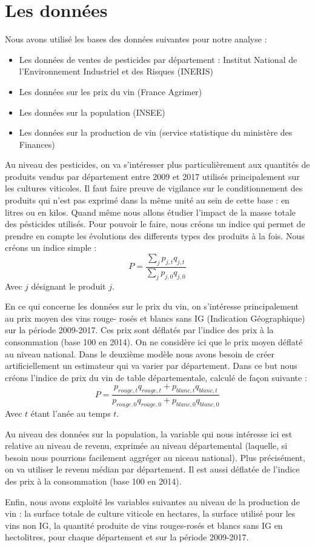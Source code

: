\documentclass[11pt, a4paper]{article}
\begin{document}
\section{Les données}
Nous avons utilisé les bases des données suivantes pour notre analyse :
\begin{itemize}
    \item Les données de ventes de pesticides par département : Institut National de l’Environnement Industriel et des Risques (INERIS)
    \item Les données sur les prix du vin (France Agrimer)
    \item Les données sur la population (INSEE)
    \item Les données sur la production de vin (service statistique du ministère des Finances)
\end{itemize}
\par
Au niveau des pesticides, on va s’intéresser plus particulièrement aux quantités de produits vendus par département entre 2009 et 2017 utilisés principalement sur les cultures viticoles. 
Il faut faire preuve de vigilance sur le conditionnement des produits qui n’est pas exprimé dans la même unité au sein de cette base : en litres ou en kilos.
Quand même nous allons étudier l'impact de la masse totale des pésticides utilisés.
Pour pouvoir le faire, nous créons un indice qui permet de prendre en compte les évolutions des differents types des produits à la fois.
Nous créons un indice simple :
\begin{equation*}
  P = \frac{\sum_j p_{j, t} q_{j, t}}{\sum_j p_{j, 0} q_{j, 0}}
\end{equation*}
Avec $j$ désignant le produit $j$.
\par
En ce qui concerne les données sur le prix du vin, on s’intéresse principalement au prix moyen des vins rouge- rosés et blancs sans IG (Indication Géographique) sur la période 2009-2017. 
Ces prix sont déflatés par l’indice des prix à la consommation (base 100 en 2014). 
On ne considère ici que le prix moyen déflaté au niveau national.
Dans le deuxième modèle nous avons besoin de créer artificiellement un estimateur qui va varier par département.
Dans ce but nous créons l'indice de prix du vin de table départementale, calculé de façon suivante :
\begin{equation*}
  P = \frac{p_{rouge, t} q_{rouge, t} + p_{blanc, t} q_{blanc, t}}{p_{rouge, 0} q_{rouge, 0} + p_{blanc, 0} q_{blanc, 0}}
\end{equation*}
Avec $t$ étant l'anée au temps $t$.
\par
Au niveau des données sur la population, la variable qui nous intéresse ici est relative au niveau de revenu, exprimée au niveau départemental (laquelle, si besoin nous pourrions facilement aggréger au niceau national). 
Plus précisément, on va utiliser le revenu médian par département.
Il est aussi déflatée de l’indice des prix à la consommation (base 100 en 2014).
\par
Enfin, nous avons exploité les variables suivantes au niveau de la production de vin : la surface totale de culture viticole en hectares, la surface utilisé pour les vins non IG, la quantité produite de vins rouges-rosés et blancs sans IG en hectolitres, pour chaque département et sur la période 2009-2017.
\end{document}
